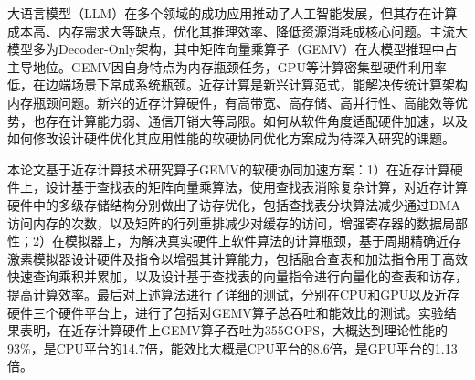 \begin{abstractzh}
大语言模型（LLM）在多个领域的成功应用推动了人工智能发展，但其存在计算成本高、内存需求大等缺点，优化其推理效率、降低资源消耗成核心问题。主流大模型多为Decoder-Only架构，其中矩阵向量乘算子（GEMV）在大模型推理中占主导地位。GEMV因自身特点为内存瓶颈任务，GPU等计算密集型硬件利用率低，在边端场景下常成系统瓶颈。近存计算是新兴计算范式，能解决传统计算架构内存瓶颈问题。新兴的近存计算硬件，有高带宽、高存储、高并行性、高能效等优势，也存在计算能力弱、通信开销大等局限。如何从软件角度适配硬件加速，以及如何修改设计硬件优化其应用性能的软硬协同优化方案成为待深入研究的课题。

本论文基于近存计算技术研究算子GEMV的软硬协同加速方案：1）在近存计算硬件上，设计基于查找表的矩阵向量乘算法，使用查找表消除复杂计算，对近存计算硬件中的多级存储结构分别做出了访存优化，包括查找表分块算法减少通过DMA访问内存的次数，以及矩阵的行列重排减少对缓存的访问，增强寄存器的数据局部性；2）在模拟器上，为解决真实硬件上软件算法的计算瓶颈，基于周期精确近存激素模拟器设计硬件及指令以增强其计算能力，包括融合查表和加法指令用于高效快速查询乘积并累加，以及设计基于查找表的向量指令进行向量化的查表和访存，提高计算效率。最后对上述算法进行了详细的测试，分别在CPU和GPU以及近存硬件三个硬件平台上，进行了包括对GEMV算子总吞吐和能效比的测试。实验结果表明，在近存计算硬件上GEMV算子吞吐为355GOPS，大概达到理论性能的93\%，是CPU平台的14.7倍，能效比大概是CPU平台的8.6倍，是GPU平台的1.13倍。
\end{abstractzh}